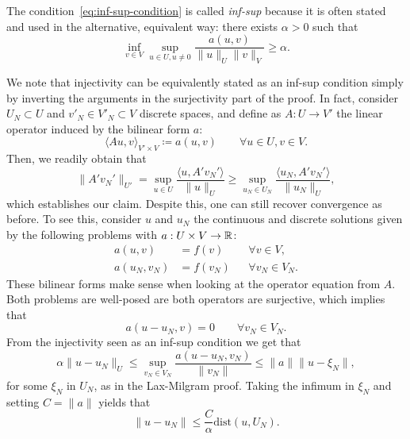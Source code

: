 The condition~\ref{eq:inf-sup-condition} is called \emph{inf-sup} because it is often stated and used in the alternative, equivalent way: there exists $\alpha>0$ such that 
\begin{equation}
    \inf_{v\in V}\sup_{u\in U,u\neq 0} \frac{a(u,v)}{\| u \|_{U}\|v\|_{V}} \ge \alpha.
\end{equation}

We note that injectivity can be equivalently stated as an inf-sup condition simply by inverting the arguments in the surjectivity part of the proof. In fact, consider $U_N\subset U$ and $v'_N\in V'_N\subset V$ discrete spaces, and define as $A:U \to V'$ the linear operator induced by the bilinear form $a$:
    $$ \langle Au, v\rangle_{V'\times V} \coloneqq a(u,v) \qquad \forall u\in U, v\in V. $$
Then, we readily obtain that 
\begin{equation*}
    \|A'v_N'\|_{U'} = \sup_{u\in U}\frac{\langle u, A'v_N'\rangle}{\|u\|_U} \geq \sup_{u_N\in U_N}\frac{\langle u_N, A'v_N'\rangle}{\|u_N\|_U},
\end{equation*}
which establishes our claim. Despite this, one can still recover convergence as before. To see this, consider $u$ and $u_N$ the continuous and discrete solutions given by the following problems with $a:U\times V \to \mathbb{R}$:
\begin{equation*}
    \begin{aligned}
        a(u,v) &= f(v) &&\forall v\in V,\\
        a(u_N, v_N) &= f(v_N) &&\forall v_N\in V_N.
    \end{aligned}
\end{equation*}
These bilinear forms make sense when looking at the operator equation from $A$. Both problems are well-posed are both operators are surjective, which implies that 
\begin{equation*}
    a(u-u_N, v) = 0  \qquad \forall v_N \in V_N.
\end{equation*}
From the injectivity seen as an inf-sup condition we get that
\begin{equation*}
    \alpha \| u - u_N \|_U \leq \sup_{v_N\in V_N} \frac{a(u-u_N, v_N)}{\|v_N\|} \leq \| a \| \|u - \xi_N \|,
\end{equation*}
for some $\xi_N$ in $U_N$, as in the Lax-Milgram proof. Taking the infimum in $\xi_N$ and setting $C=\|a\|$ yields that
\begin{equation*}
    \| u - u_N \| \leq \frac{C}{\alpha}\text{dist}(u, U_N).
\end{equation*}

